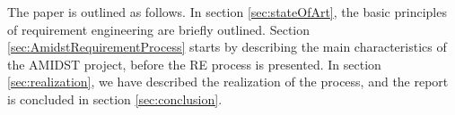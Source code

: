 The paper is outlined as follows. In section  \ref{sec:stateOfArt}, the basic principles of requirement engineering are briefly outlined. Section  \ref{sec:AmidstRequirementProcess} starts by describing the main characteristics of the AMIDST project, before the RE process is presented. In section  \ref{sec:realization}, we have described the realization of the process, and the report is concluded in section  \ref{sec:conclusion}.
